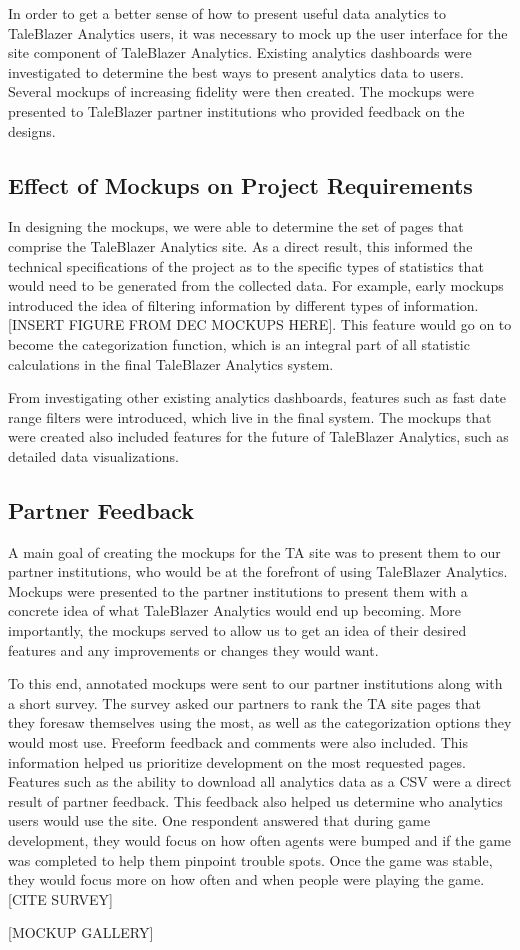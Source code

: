 In order to get a better sense of how to present useful data analytics to TaleBlazer Analytics users, it was necessary to mock up the user interface for the site component of TaleBlazer Analytics. Existing analytics dashboards were investigated to determine the best ways to present analytics data to users. Several mockups of increasing fidelity were then created. The mockups were presented to TaleBlazer partner institutions who provided feedback on the designs. 

\subsection{Effect of Mockups on Project Requirements}

In designing the mockups, we were able to determine the set of pages that comprise the TaleBlazer Analytics site. As a direct result, this informed the technical specifications of the project as to the specific types of statistics that would need to be generated from the collected data. For example, early mockups introduced the idea of filtering information by different types of information. [INSERT FIGURE FROM DEC MOCKUPS HERE]. This feature would go on to become the categorization function, which is an integral part of all statistic calculations in the final TaleBlazer Analytics system. 

From investigating other existing analytics dashboards, features such as fast date range filters were introduced, which live in the final system. The mockups that were created also included features for the future of TaleBlazer Analytics, such as detailed data visualizations. 

\subsection{Partner Feedback}

A main goal of creating the mockups for the TA site was to present them to our partner institutions, who would be at the forefront of using TaleBlazer Analytics. Mockups were presented to the partner institutions to present them with a concrete idea of what TaleBlazer Analytics would end up becoming. More importantly, the mockups served to allow us to get an idea of their desired features and any improvements or changes they would want. 

To this end, annotated mockups were sent to our partner institutions along with a short survey. The survey asked our partners to rank the TA site pages that they foresaw themselves using the most, as well as the categorization options they would most use. Freeform feedback and comments were also included. This information helped us prioritize development on the most requested pages. Features such as the ability to download all analytics data as a CSV were a direct result of partner feedback. This feedback also helped us determine who analytics users would use the site. One respondent answered that during game development, they would focus on how often agents were bumped and if the game was completed to help them pinpoint trouble spots. Once the game was stable, they would focus more on how often and when people were playing the game. [CITE SURVEY]

[MOCKUP GALLERY]





